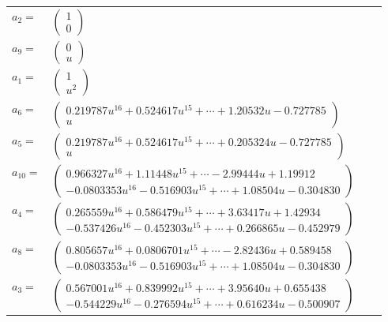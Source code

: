 \documentclass[1p]{elsarticle_modified}
\theoremstyle{definition}
\begin{document}
\begin{tabular}{m{7pt} m{180pt} m{7pt} m{180pt} }
\flushright $a_{2}=$&$\begin{pmatrix}1\\0\end{pmatrix}$ \\
\flushright $a_{9}=$&$\begin{pmatrix}0\\u\end{pmatrix}$ \\
\flushright $a_{1}=$&$\begin{pmatrix}1\\u^2\end{pmatrix}$ \\
\flushright $a_{6}=$&$\begin{pmatrix}0.219787 u^{16}+0.524617 u^{15}+\cdots+1.20532 u-0.727785\\u\end{pmatrix}$ \\
\flushright $a_{5}=$&$\begin{pmatrix}0.219787 u^{16}+0.524617 u^{15}+\cdots+0.205324 u-0.727785\\u\end{pmatrix}$ \\
\flushright $a_{10}=$&$\begin{pmatrix}0.966327 u^{16}+1.11448 u^{15}+\cdots-2.99444 u+1.19912\\-0.0803353 u^{16}-0.516903 u^{15}+\cdots+1.08504 u-0.304830\end{pmatrix}$ \\
\flushright $a_{4}=$&$\begin{pmatrix}0.265559 u^{16}+0.586479 u^{15}+\cdots+3.63417 u+1.42934\\-0.537426 u^{16}-0.452303 u^{15}+\cdots+0.266865 u-0.452979\end{pmatrix}$ \\
\flushright $a_{8}=$&$\begin{pmatrix}0.805657 u^{16}+0.0806701 u^{15}+\cdots-2.82436 u+0.589458\\-0.0803353 u^{16}-0.516903 u^{15}+\cdots+1.08504 u-0.304830\end{pmatrix}$ \\
\flushright $a_{3}=$&$\begin{pmatrix}0.567001 u^{16}+0.839992 u^{15}+\cdots+3.95640 u+0.655438\\-0.544229 u^{16}-0.276594 u^{15}+\cdots+0.616234 u-0.500907\end{pmatrix}$ \\

\end{tabular}
\end{document}
